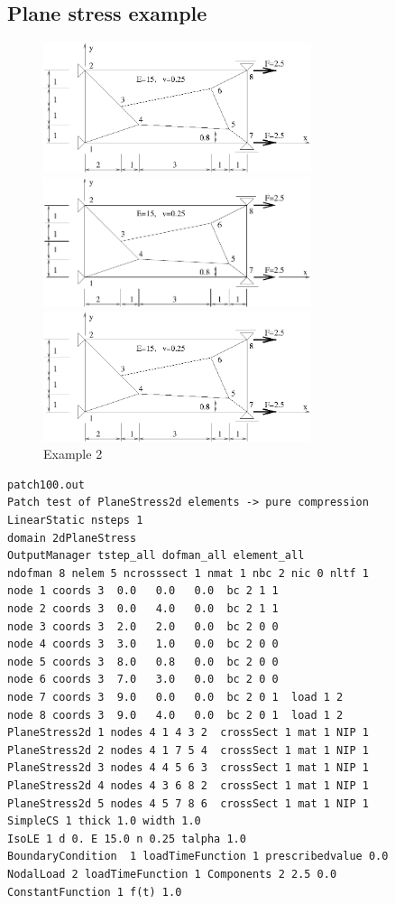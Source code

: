 \documentclass[a4paper]{article}
\begin{document}
\subsection {Plane stress example}
\begin{figure}[tb]
\begin{htmlonly}
  \centerline{\includegraphics[width=0.7\textwidth]{ex02.eps}}
\end{htmlonly}
\ifpdf
\centerline{\includegraphics[width=0.7\textwidth]{ex02.pdf}}
\else
\centerline{\includegraphics[width=0.7\textwidth]{ex02.eps}}
\fi
\caption{Example 2}
\label{ex02}
\end{figure}
{\small\begin{verbatim}
patch100.out
Patch test of PlaneStress2d elements -> pure compression
LinearStatic nsteps 1
domain 2dPlaneStress
OutputManager tstep_all dofman_all element_all
ndofman 8 nelem 5 ncrosssect 1 nmat 1 nbc 2 nic 0 nltf 1
node 1 coords 3  0.0   0.0   0.0  bc 2 1 1
node 2 coords 3  0.0   4.0   0.0  bc 2 1 1
node 3 coords 3  2.0   2.0   0.0  bc 2 0 0
node 4 coords 3  3.0   1.0   0.0  bc 2 0 0
node 5 coords 3  8.0   0.8   0.0  bc 2 0 0
node 6 coords 3  7.0   3.0   0.0  bc 2 0 0
node 7 coords 3  9.0   0.0   0.0  bc 2 0 1  load 1 2
node 8 coords 3  9.0   4.0   0.0  bc 2 0 1  load 1 2
PlaneStress2d 1 nodes 4 1 4 3 2  crossSect 1 mat 1 NIP 1
PlaneStress2d 2 nodes 4 1 7 5 4  crossSect 1 mat 1 NIP 1
PlaneStress2d 3 nodes 4 4 5 6 3  crossSect 1 mat 1 NIP 1
PlaneStress2d 4 nodes 4 3 6 8 2  crossSect 1 mat 1 NIP 1
PlaneStress2d 5 nodes 4 5 7 8 6  crossSect 1 mat 1 NIP 1
SimpleCS 1 thick 1.0 width 1.0
IsoLE 1 d 0. E 15.0 n 0.25 talpha 1.0
BoundaryCondition  1 loadTimeFunction 1 prescribedvalue 0.0
NodalLoad 2 loadTimeFunction 1 Components 2 2.5 0.0
ConstantFunction 1 f(t) 1.0
\end{verbatim}}
\end{document}

